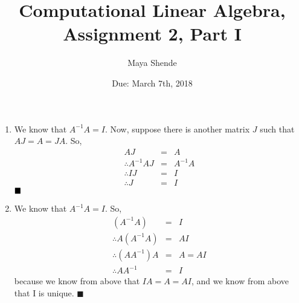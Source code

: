 \documentclass{article}
\title{Computational Linear Algebra, Assignment 2, Part I}
\author{Maya Shende}
\date{Due: March 7th, 2018}
\newcommand*{\qed}{\hfill\ensuremath{\blacksquare}}
\begin{document}
\maketitle

\begin{enumerate}
	\item We know that $A^{-1}A = I$. Now, suppose there is another matrix $J$ such that $AJ = A = JA$. So, 
	\begin{eqnarray*}
		AJ &=& A\\
		\therefore A^{-1}AJ &=& A^{-1}A\\
		\therefore IJ &=& I\\
		\therefore J &=& I
	\end{eqnarray*} $\qed$
	
	\item We know that $A^{-1}A = I$. So, 
	\begin{eqnarray*}
		(A^{-1}A) &=& I\\
		\therefore A(A^{-1}A) &=& AI\\
		\therefore (AA^{-1})A &=& A = AI\\
		\therefore AA^{-1} &=& I
	\end{eqnarray*}
	because we know from above that $IA = A = AI$, and we know from above that I is unique. \qed
\end{enumerate}
\end{document}
